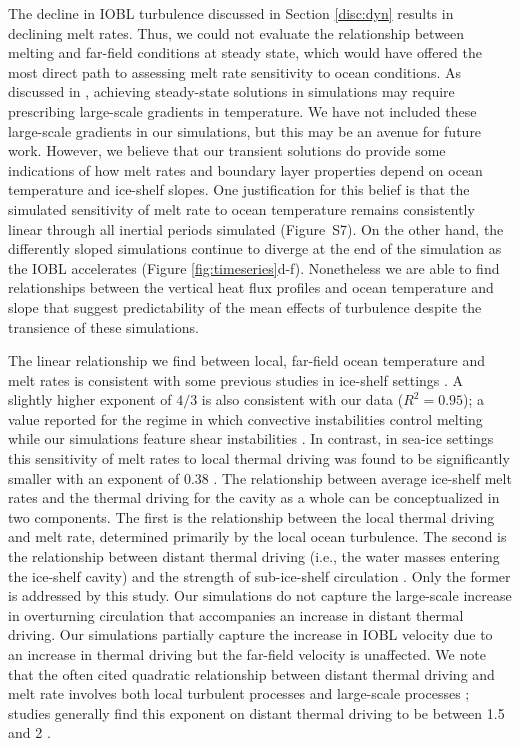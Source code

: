 \documentclass[tc, manuscript]{copernicus}
\begin{document}
The decline in IOBL turbulence discussed in Section \ref{disc:dyn} results in declining melt rates. Thus, we could not evaluate the relationship between melting and far-field conditions at steady state, which would have offered the most direct path to assessing melt rate sensitivity to ocean conditions. As discussed in \citet{jenkins_simple_2016}, achieving steady-state solutions in simulations may require prescribing large-scale gradients in temperature. We have not included these large-scale gradients in our simulations, but this may be an avenue for future work. However, we believe that our transient solutions do provide some indications of how melt rates and boundary layer properties depend on ocean temperature and ice-shelf slopes. One justification for this belief is that the simulated sensitivity of melt rate to ocean temperature remains consistently linear through all inertial periods simulated (Figure~S7). On the other hand, the differently sloped simulations continue to diverge at the end of the simulation as the IOBL accelerates (Figure \ref{fig:timeseries}d-f). Nonetheless we are able to find relationships between the vertical heat flux profiles and ocean temperature and slope that suggest predictability of the mean effects of turbulence despite the transience of these simulations.

The linear relationship we find between local, far-field ocean temperature and melt rates is consistent with some previous studies in ice-shelf settings \citep{holland_response_2008, rignot_rapid_2002, vreugdenhil_stratification_2019}. A slightly higher exponent of $4/3$ is also consistent with our data ($R^2=0.95$); a value reported for the regime in which convective instabilities control melting while our simulations feature shear instabilities \citep{kerr_dissolution_2015}. In contrast, in sea-ice settings this sensitivity of melt rates to local thermal driving was found to be significantly smaller with an exponent of 0.38 \citep{ramudu_large_2018}. The relationship between average ice-shelf melt rates and the thermal driving for the cavity as a whole can be conceptualized in two components. The first is the relationship between the local thermal driving and melt rate, determined primarily by the local ocean turbulence. The second is the relationship between distant thermal driving (i.e., the water masses entering the ice-shelf cavity) and the strength of sub-ice-shelf circulation \citep{holland_response_2008}. Only the former is addressed by this study. Our simulations do not capture the large-scale increase in overturning circulation that accompanies an increase in distant thermal driving. Our simulations partially capture the increase in IOBL velocity due to an increase in thermal driving but the far-field velocity is unaffected. We note that the often cited quadratic relationship between distant thermal driving and melt rate involves both local turbulent processes and large-scale processes \citep{holland_response_2008}; studies generally find this exponent on distant thermal driving to be between 1.5 and 2 \citep{favier_assessment_2019, jourdain_ocean_2017, little_how_2009}. 
\end{document}
